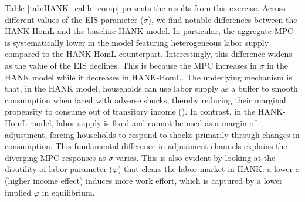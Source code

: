 \documentclass[a4paper,12pt]{article}%
\begin{document}
Table \ref{tab:HANK_calib_comp} presents the results from this exercise. Across different values of the EIS parameter ($\sigma$), we find notable differences between the HANK-HomL and the baseline HANK model. In particular, the aggregate MPC is systematically lower in the model featuring heterogeneous labor supply compared to the HANK-HomL counterpart. Interestingly, this difference widens as the value of the EIS declines. This is because the MPC increases in $\sigma$ in the HANK model while it decreases in HANK-HomL. The underlying mechanism is that, in the HANK model, households can use labor supply as a buffer to smooth consumption when faced with adverse shocks, thereby reducing their marginal propensity to consume out of transitory income (\cite{pijoan-mas_precautionary_2006}). In contrast, in the HANK-HomL model, labor supply is fixed and cannot be used as a margin of adjustment, forcing households to respond to shocks primarily through changes in consumption. This fundamental difference in adjustment channels explains the diverging MPC responses as $\sigma$ varies. This is also evident by looking at the disutility of labor parameter ($\varphi$) that clears the labor market in HANK: a lower $\sigma$ (higher income effect) induces more work effort, which is captured by a lower implied $\varphi$ in equilibrium.

\end{document}
